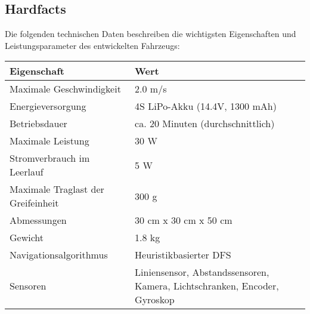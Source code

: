 \documentclass[main.tex]{subfiles} %
\begin{document}

\subsection{Hardfacts}

Die folgenden technischen Daten beschreiben die wichtigsten Eigenschaften und
Leistungsparameter des entwickelten Fahrzeugs:

\begin{table}[h!]
    \centering
    \renewcommand{\arraystretch}{1.5}
    \begin{tabular}{|l|l|}
        \hline
        \textbf{Eigenschaft}               & \textbf{Wert}                                                             \\ \hline
        Maximale Geschwindigkeit           & 2.0 m/s                                                                   \\ \hline
        Energieversorgung                  & 4S LiPo-Akku (14.4V, 1300 mAh)                                            \\ \hline
        Betriebsdauer                      & ca. 20 Minuten (durchschnittlich)                                         \\ \hline
        Maximale Leistung                  & 30 W                                                                      \\ \hline %
        Stromverbrauch im Leerlauf         & 5 W                                                                       \\ \hline %
        Maximale Traglast der Greifeinheit & 300 g                                                                     \\ \hline %
        Abmessungen                        & 30 cm x 30 cm x 50 cm                                                     \\ \hline
        Gewicht                            & 1.8 kg                                                                    \\ \hline
        Navigationsalgorithmus             & Heuristikbasierter DFS                                                    \\ \hline
        Sensoren                           & Liniensensor, Abstandssensoren, Kamera, Lichtschranken, Encoder, Gyroskop \\ \hline

\end{tabular}
\end{table}
\end{document}
